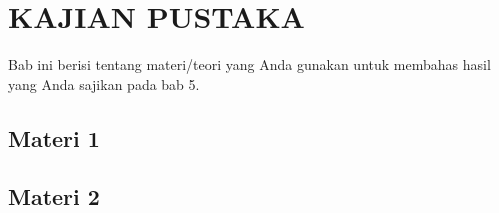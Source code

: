 \chapter{KAJIAN PUSTAKA}

Bab ini berisi tentang materi/teori yang Anda gunakan untuk membahas hasil yang Anda sajikan pada bab 5.

\section{Materi 1}

\section{Materi 2}